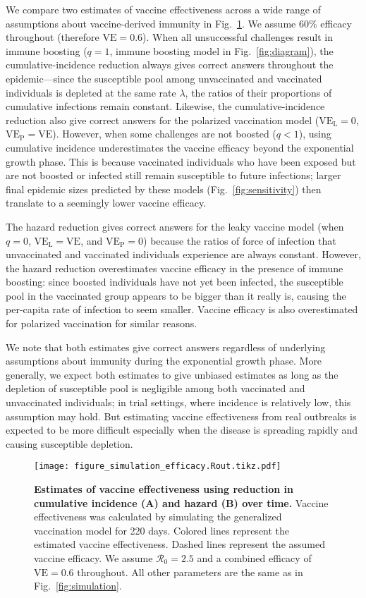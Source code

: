 \documentclass[12pt]{article}
\newcommand{\fref}[1]{Fig.~\ref{fig:#1}}
\newcommand{\Rx}[1]{\ensuremath{{\mathcal R}_{#1}}\xspace}
\newcommand{\Ro}{\Rx{0}}
\newcommand{\VE}{\ensuremath{\mathrm{VE}}}
\newcommand{\VEP}{\ensuremath{\VE_{\mathrm{P}}}}
\newcommand{\VEL}{\ensuremath{\VE_{\mathrm{L}}}}
\begin{document}
We compare two estimates of vaccine effectiveness across a wide range of assumptions about vaccine-derived immunity in \fref{efficacy}.
We assume 60\% efficacy throughout (therefore $\VE = 0.6$).
When all unsuccessful challenges result in immune boosting ($q=1$, immune boosting model in \fref{diagram}), the cumulative-incidence reduction always gives correct answers throughout the epidemic---since the susceptible pool among unvaccinated and vaccinated individuals is depleted at the same rate $\lambda$, the ratios of their proportions of cumulative infections remain constant.
Likewise, the cumulative-incidence reduction also give correct answers for the polarized vaccination model ($\VEL = 0$, $\VEP = \VE$).
However, when some challenges are not boosted ($q < 1$), using cumulative incidence underestimates the vaccine efficacy beyond the exponential growth phase.
This is because vaccinated individuals who have been exposed but are not boosted or infected still remain susceptible to future infections; 
larger final epidemic sizes predicted by these models (\fref{sensitivity}) then translate to a seemingly lower vaccine efficacy.

The hazard reduction gives correct answers for the leaky vaccine model (when $q=0$, $\VEL = \VE$, and $\VEP = 0$) because the ratios of force of infection that unvaccinated and vaccinated individuals experience are always constant.
However, the hazard reduction overestimates vaccine efficacy in the presence of immune boosting: since boosted individuals have not yet been infected, the susceptible pool in the vaccinated group appears to be bigger than it really is, causing the per-capita rate of infection to seem smaller.
Vaccine efficacy is also overestimated for polarized vaccination for similar reasons.

We note that both estimates give correct answers regardless of underlying assumptions about immunity during the exponential growth phase.
More generally, we expect both estimates to give unbiased estimates as long as the depletion of susceptible pool is negligible among both vaccinated and unvaccinated individuals;
in trial settings, where incidence is relatively low, this assumption may hold.
But estimating vaccine effectiveness from real outbreaks is expected to be more difficult especially when the disease is spreading rapidly and causing susceptible depletion.

\begin{figure}[!th]
\texttt{[image: figure\_simulation\_efficacy.Rout.tikz.pdf]}
\caption{
\textbf{Estimates of vaccine effectiveness using reduction in cumulative incidence (A) and hazard (B) over time.}
Vaccine effectiveness was calculated by simulating the generalized vaccination model for 220 days. 
Colored lines represent the estimated vaccine effectiveness.
Dashed lines represent the assumed vaccine efficacy.
We assume $\Ro = 2.5$ and a combined efficacy of $\VE = 0.6$ throughout. 
All other parameters are the same as in \fref{simulation}.
\label{fig:efficacy}
}
\end{figure}
\end{document}
